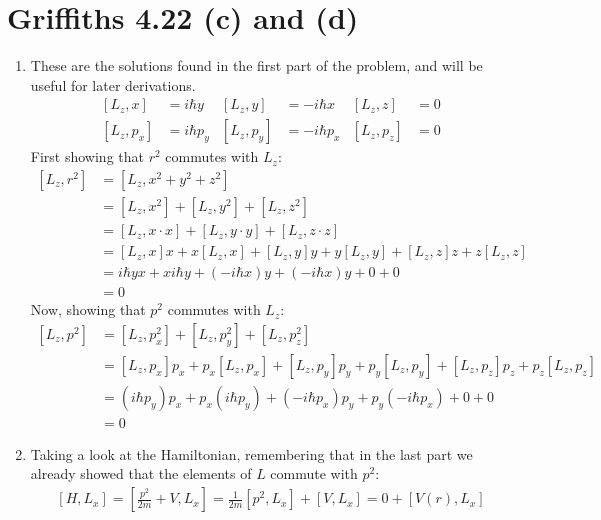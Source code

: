 \documentclass[11pt]{article}
\begin{document}
\section*{Griffiths 4.22 (c) and (d)}
\begin{enumerate}[label=\alph*)]
\addtocounter{enumi}{2}
\item 
These are the solutions found in the first part of the problem, and will be useful for later derivations.
\begin{align*}
\left[L_z, x\right] &= i\hbar y & \left[L_z, y\right] &= -i\hbar x & \left[L_z, z\right] & = 0\\
\left[L_z, p_x\right] &= i\hbar p_y & \left[L_z, p_y\right] &= -i\hbar p_x & \left[L_z, p_z\right] &= 0
\end{align*}
First showing that $r^2$ commutes with $L_z$:
\begin{align*}
\left[L_z, r^2\right] & = \left[L_z, x^2+y^2+z^2\right]\\
& = \left[L_z, x^2\right] + \left[L_z, y^2\right] + \left[L_z, z^2\right]\\
& =  \left[L_z, x\cdot x\right] + \left[L_z, y\cdot y\right] + \left[L_z, z\cdot z\right] \\
& = \left[L_z, x\right]x + x\left[L_z, x\right] + \left[L_z, y\right]y + y\left[L_z, y\right] + \left[L_z, z\right]z + z\left[L_z, z\right]\\
& = i\hbar yx + xi\hbar y + (-i\hbar x)y + (-i\hbar x)y +0 +0 \\
& = 0
\end{align*}
Now, showing that $p^2$ commutes with $L_z$:
\begin{align*}
\left[L_z, p^2\right] &= \left[L_z, p_x^2\right] + \left[L_z, p_y^2\right] + \left[L_z, p_z^2\right]\\
&= \left[L_z, p_x\right]p_x + p_x\left[L_z, p_x\right] + \left[L_z, p_y\right]p_y + p_y\left[L_z, p_y\right] + \left[L_z, p_z\right]p_z + p_z\left[L_z, p_z\right]\\
& = (i\hbar p_y)p_x + p_x(i\hbar p_y) + (-i\hbar p_x)p_y + p_y(-i\hbar p_x) + 0 +0 \\
&  = 0
\end{align*}
\item 
Taking a look at the Hamiltonian, remembering that in the last part we already showed that the elements of $L$ commute with $p^2$:
\begin{align*}
\left[H, L_x\right] = \left[\frac{p^2}{2m}+V, L_x\right] = \frac{1}{2m}\left[p^2, L_x\right] + \left[V, L_x\right] = 0 + \left[V(r), L_x\right]

\end{align*}
\end{enumerate}
\end{document}
